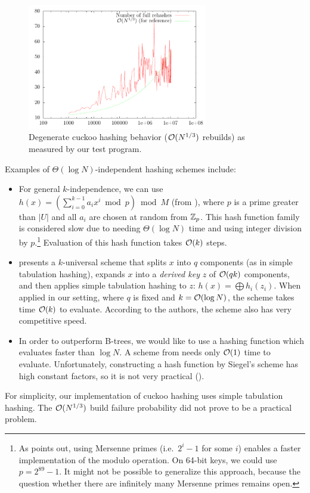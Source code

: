 \begin{figure}
	\centering
	\includegraphics[width=0.7\textwidth]{img/cuckoo/results}
	\caption{Degenerate cuckoo hashing behavior ($\mathcal{O}(N^{1/3})$ rebuilds)
		as measured by our test program.}
\end{figure}

Examples of $\Theta(\log N)$-independent hashing schemes include:
\begin{itemize}
\item For general $k$-independence, we can use
	$h(x)=(\sum_{i=0}^{k-1} a_i x^i \bmod p) \bmod M$ (from
	\cite{new-hash-fns}), where $p$ is a prime greater than $|U|$ and
	all $a_i$ are chosen at random from $\mathbb{Z}_p$.
	This hash function family is considered slow due to needing
	$\Theta(\log N)$ time and using integer division by $p$.\footnote{
		As \cite{univ-classes} points out, using Mersenne primes
		(i.e.\ $2^i-1$ for some $i$) enables a faster implementation of
		the modulo operation. On 64-bit keys, we could use $p=2^{89}-1$.
		It might not be possible to generalize this approach, because
		the question whether there are infinitely many Mersenne primes
		remains open.
	}
	Evaluation of this hash function takes $\mathcal{O}(k)$ steps.
\item \cite{tab-based-4uni-hashing} presents a $k$-universal scheme that splits
	$x$ into $q$ components (as in simple tabulation hashing),
	expands $x$ into a \emph{derived key} $z$ of $\mathcal{O}(qk)$ components,
	and then applies simple tabulation hashing to $z$:
	$h(x)=\bigoplus h_i(z_i)$.
	When applied in our setting, where $q$ is fixed and $k=\mathcal{O}(\log N)$,
	the scheme takes time $\mathcal{O}(k)$ to evaluate.
	According to the authors, the scheme also has very competitive speed.
\item In order to outperform B-trees, we would like to use a hashing function
	which evaluates faster than $\log N$. A scheme from \cite{siegel-1995}
	needs only $\mathcal{O}(1)$ time to evaluate. Unfortunately, constructing a hash
	function by Siegel's scheme has high constant factors, so it is not
	very practical (\cite{pagh-phd}).
\end{itemize}



For simplicity, our implementation of cuckoo hashing uses simple tabulation
hashing. The $\mathcal{O}(N^{1/3})$ build failure probability did not prove to be a
practical problem.
